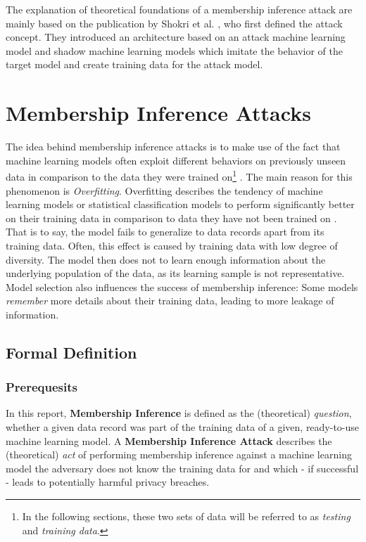\documentclass[runningheads]{llncs}
\begin{document}
The explanation of theoretical foundations of a membership inference attack are mainly based on the publication by Shokri et al. \cite{shokri2017membership}, who first defined the attack concept. They introduced an architecture based on an attack machine learning model and shadow machine learning models which imitate the behavior of the target model and create training data for the attack model.

\section{Membership Inference Attacks}

The idea behind membership inference attacks is to make use of the fact that machine learning models often exploit different behaviors on previously unseen data in comparison to the data they were trained on\footnote{In the following sections, these two sets of data will be referred to as \textit{testing} and \textit{training data}.} \cite{shokri2017membership}. The main reason for this phenomenon is \textit{Overfitting}. Overfitting describes the tendency of machine learning models or statistical classification models to perform significantly better on their training data in comparison to data they have not been trained on \cite{weigend1994overfitting}. That is to say, the model fails to generalize to data records apart from its training data. Often, this effect is caused by training data with low degree of diversity. The model then does not to learn enough information about the underlying population of the data, as its learning sample is not representative.
Model selection also influences the success of membership inference: Some models \textit{remember} more details about their training data, leading to more leakage of information.

\subsection{Formal Definition}

\subsubsection{Prerequesits}
In this report, \textbf{Membership Inference} is defined as the (theoretical) \textit{question}, whether a given data record was part of the training data of a given, ready-to-use machine learning model. A \textbf{Membership Inference Attack} describes the (theoretical) \textit{act} of performing membership inference against a machine learning model the adversary does not know the training data for and which - if successful - leads to potentially harmful privacy breaches.
\end{document}
